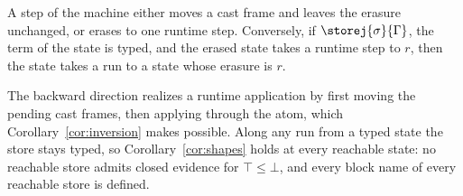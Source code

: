 \begin{theorem}
A step of the machine either moves a cast frame and leaves the erasure unchanged, or erases to one runtime step. Conversely, if $\storej{\sigma}{\Gamma}$, the term of the state is typed, and the erased state takes a runtime step to $r$, then the state takes a run to a state whose erasure is $r$.
\end{theorem}

The backward direction realizes a runtime application by first moving the pending cast frames, then applying through the atom, which Corollary~\ref{cor:inversion} makes possible. Along any run from a typed state the store stays typed, so Corollary~\ref{cor:shapes} holds at every reachable state: no reachable store admits closed evidence for $\top \le \bot$, and every block name of every reachable store is defined.
